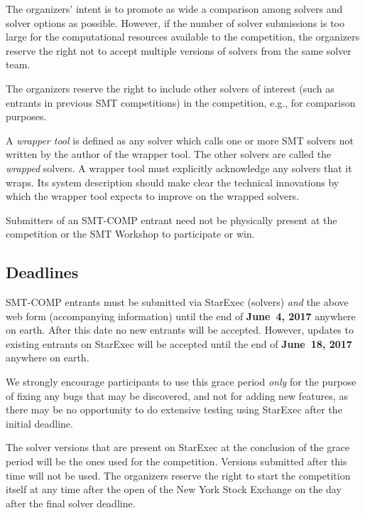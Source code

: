 \documentclass[12pt]{article}
\begin{document}
%
The organizers' intent is to promote as wide a comparison among
solvers and solver options as possible.  However, if the number of
solver submissions is too large for the computational resources
available to the competition, the organizers reserve the right not to
accept multiple versions of solvers from the same solver team.

%
The organizers reserve the right to include other solvers of interest
(such as entrants in previous SMT competitions) in the competition,
e.g., for comparison purposes.

%
A \emph{wrapper tool} is defined as any solver which calls one or more
SMT solvers not written by the author of the wrapper tool.  The other
solvers are called the \emph{wrapped} solvers.  A wrapper tool must
explicitly acknowledge any solvers that it wraps.  Its system
description should make clear the technical innovations by which the
wrapper tool expects to improve on the wrapped solvers.

%
Submitters of an SMT-COMP entrant need not be physically present at
the competition or the SMT Workshop to participate or win.


\subsection*{Deadlines}

SMT-COMP entrants must be submitted via StarExec (solvers) \emph{and}
the above web form (accompanying information) until the end of {\bf
  June~4, 2017} anywhere on earth.  After this date no new entrants
will be accepted.  However, updates to existing entrants on StarExec
will be accepted until the end of {\bf June~18, 2017} anywhere on
earth.

We strongly encourage participants to use this grace period
\emph{only} for the purpose of fixing any bugs that may be discovered,
and not for adding new features, as there may be no opportunity to do
extensive testing using StarExec after the initial deadline.

The solver versions that are present on StarExec at the conclusion of
the grace period will be the ones used for the competition.  Versions
submitted after this time will not be used.  The organizers reserve
the right to start the competition itself at any time after the open
of the New York Stock Exchange on the day after the final solver
deadline.
\end{document}

